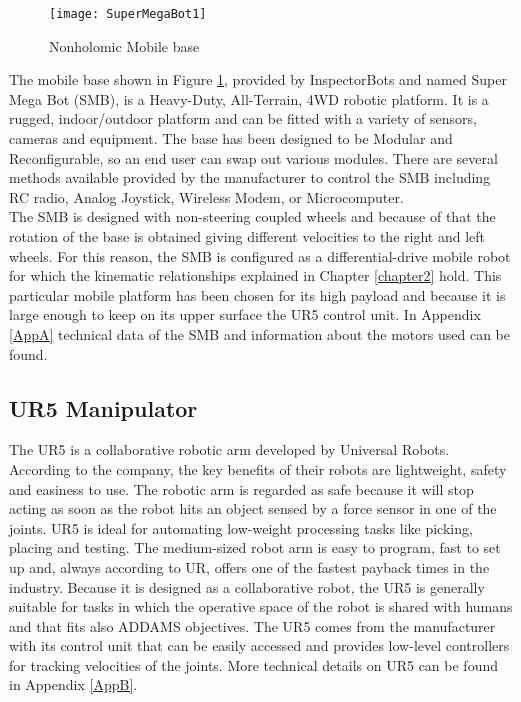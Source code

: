 \begin{figure}[h]
\begin{center} 
	\texttt{[image: SuperMegaBot1]}
	\centering
	\caption{Nonholomic Mobile base}
	\label{fig:SuperMegaBot1}
\end{center}
\end{figure}
The mobile base shown in Figure \ref{fig:SuperMegaBot1}, provided by InspectorBots and named Super Mega Bot (SMB), is a Heavy-Duty, All-Terrain, 4WD robotic platform. It is a rugged, indoor/outdoor platform and can be fitted with a variety of sensors, cameras and equipment. The base has been designed to be Modular and Reconfigurable, so an end user can swap out various modules. There are several methods available provided by the manufacturer to control the SMB including RC radio, Analog Joystick, Wireless Modem, or Microcomputer.\\
The SMB is designed with non-steering coupled wheels and because of that the rotation of the base is obtained giving different velocities to the right and left wheels. For this reason, the SMB is configured as a differential-drive mobile robot for which the kinematic relationships explained in Chapter \ref{chapter2} hold. This particular mobile platform has been chosen for its high payload and because it is large enough to keep on its upper surface the UR5 control unit. In Appendix \ref{AppA} technical data of the SMB and information about the motors used can be found.

\subsection{UR5 Manipulator}
The UR5 is a collaborative robotic arm developed by Universal Robots. According to the company, the key benefits of their robots are lightweight, safety and easiness to use. The robotic arm is regarded as safe because it will stop acting as soon as the robot hits an object sensed by a force sensor in one of the joints. UR5 is ideal for automating low-weight processing tasks like picking, placing and testing. The medium-sized robot arm is easy to program, fast to set up and, always according to UR, offers one of the fastest payback times in the industry. Because it is designed as a collaborative robot, the UR5 is generally suitable for tasks in which the operative space of the robot is shared with humans and that fits also ADDAMS objectives. The UR5 comes from the manufacturer with its control unit that can be easily accessed and provides low-level controllers for tracking velocities of the joints. More technical details on UR5 can be found in Appendix \ref{AppB}.

